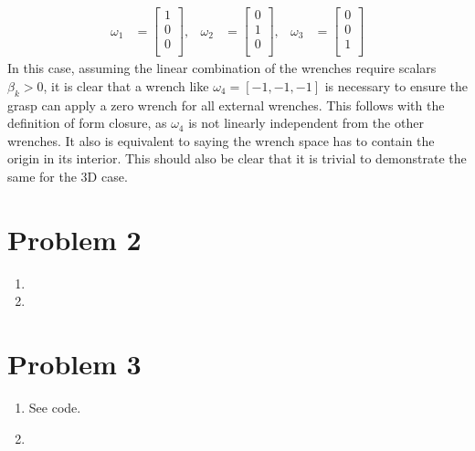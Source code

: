 \documentclass{article}
\begin{document}
\begin{enumerate}[label=(\roman*)]
\begin{align}
\omega_1 &= \begin{bmatrix}
1 \\
0 \\
0 \\
\end{bmatrix}, &
\omega_2 &= \begin{bmatrix}
0 \\
1 \\
0 \\
\end{bmatrix}, &
\omega_3 &= \begin{bmatrix}
0 \\
0 \\
1 \\
\end{bmatrix} 
\end{align}
In this case, assuming the linear combination of the wrenches require scalars $\beta_{k} > 0$, it is clear that a wrench like $\omega_4 = [-1, -1, -1]$ is necessary to ensure the grasp can apply a zero wrench for all external wrenches. This follows with the definition of form closure, as $\omega_4$ is not linearly independent from the other wrenches. It also is equivalent to saying the wrench space has to contain the origin in its interior. This should also be clear  that it is trivial to demonstrate the same for the 3D case.

\end{enumerate}



\section*{Problem 2}
\begin{enumerate}[label=(\roman*)]
\item
\item

\end{enumerate}



\section*{Problem 3}
\begin{enumerate}[label=(\roman*)]
\item See code.
\item

\end{enumerate}
\end{document}
